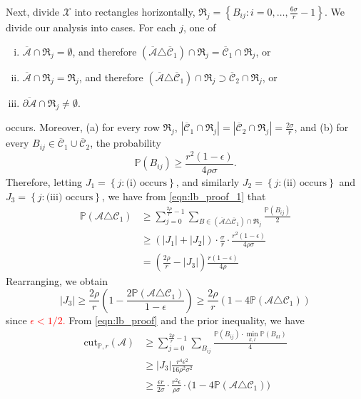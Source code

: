 \documentclass[11pt,twoside]{article}
\newcommand{\set}[1]{\left\{#1\right\}}
\newcommand{\cut}{\mathrm{cut}}
\newcommand{\abs}[1]{\left \lvert #1 \right \rvert}
\newcommand{\1}{\mathbf{1}}
\newcommand{\Pbb}{\mathbb{P}}
\newcommand{\Cset}{\mathcal{C}}
\newcommand{\Aset}{\mathcal{A}}
\begin{document}
Next, divide $\mathcal{X}$ into rectangles horizontally, $\mathfrak{R}_j = \set{B_{ij}: i = 0,\ldots,\frac{6\sigma}{r} - 1}$. We divide our analysis into cases. For each $j$, one of
\begin{enumerate}[(i)]
	\item $\overline{\Aset} \cap \mathfrak{R}_j = \emptyset$, and therefore $(\overline{\Aset} \triangle \overline{\Cset}_1) \cap \mathfrak{R}_j = \overline{\Cset}_1 \cap \mathfrak{R}_j$, or
	\item $\overline{\Aset} \cap \mathfrak{R}_j = \mathfrak{R}_j$, and therefore $(\overline{\Aset} \triangle \overline{\Cset}_1) \cap \mathfrak{R}_j \supset \overline{\Cset}_2 \cap \mathfrak{R}_j$, or
	\item $\overline{\partial\mathcal{A}} \cap \mathfrak{R}_j \neq \emptyset$.
\end{enumerate}
occurs. Moreover, (a) for every row $\mathfrak{R}_j$, $\abs{\overline{\Cset}_1 \cap \mathfrak{R}_j} =  \abs{\overline{\Cset}_2 \cap \mathfrak{R}_j} = \frac{2\sigma}{r}$, and (b) for every $B_{ij} \in \overline{\Cset}_1 \cup \overline{\Cset}_2$, the probability
\begin{equation*}
\Pbb(B_{ij}) \geq  \frac{r^2(1 - \epsilon)}{4\rho \sigma}.
\end{equation*}
Therefore, letting $J_1 = \set{j: \textrm{(i) occurs}}$, and similarly $J_2 = \set{j: \textrm{(ii) occurs}}$ and  $J_3 = \set{j: \textrm{(iii) occurs}}$, we have from \eqref{eqn:lb_proof_1} that
\begin{align*}
\Pbb(\Aset \triangle \Cset_1) & \geq \sum_{j = 0}^{\frac{2\rho}{r} - 1} \sum_{B \in (\overline{\Aset} \triangle \overline{\Cset}_1) \cap \mathfrak{R}_j} \frac{\Pbb(B_{ij})}{2} \\
& \geq \left(\abs{J_1} + \abs{J_2}\right) \cdot \frac{\sigma}{r} \cdot \frac{r^2(1 - \epsilon)}{4\rho \sigma} \\
& = \left(\frac{2\rho}{r} - \abs{J_3}\right) \frac{r(1 - \epsilon)}{4\rho}
\end{align*}
Rearranging, we obtain
\begin{equation*}
\abs{J_3} \geq \frac{2\rho}{r}\left(1 - \frac{2\Pbb(\Aset \triangle \Cset_1)}{1 - \epsilon}\right) \geq \frac{2\rho}{r}\left(1 - 4\Pbb(\Aset \triangle \Cset_1)\right)
\end{equation*}
since \textcolor{red}{$\epsilon < 1/2$.} From \eqref{eqn:lb_proof} and the prior inequality, we have
\begin{align}
\cut_{\Pbb,r}(\Aset) & \geq \sum_{j = 0}^{\frac{2\rho}{r} - 1} \sum_{B_{ij}} \frac{\Pbb(B_{ij}) \cdot \min_{k,l} \Pbb(B_{kl})}{4} \nonumber \\
& \geq \abs{J_3} \frac{r^4\epsilon^2}{16\rho^2\sigma^2} \nonumber \\
& \geq \frac{\epsilon r}{2\sigma} \cdot \frac{r^2 \epsilon}{\rho\sigma} \cdot \bigl(1 - 4\Pbb(\Aset \triangle \Cset_1)\bigr) \label{eqn:lb_proof_3}
\end{align}
\end{document}
